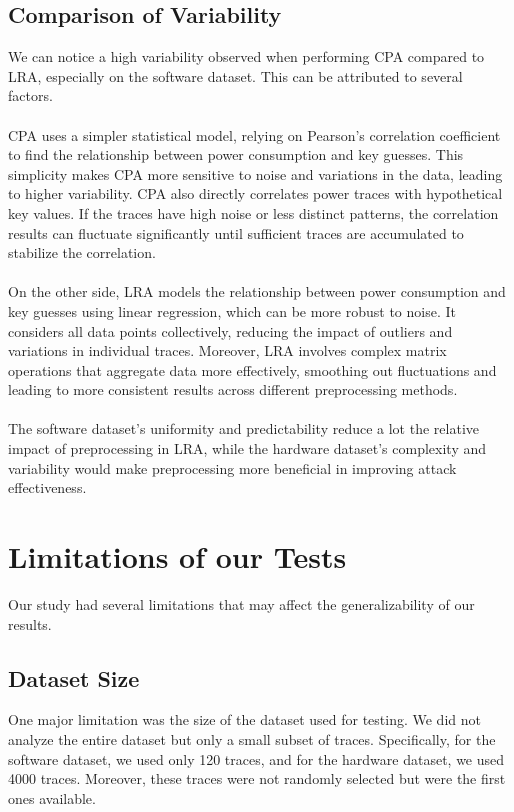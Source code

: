 \documentclass[a4paper,10pt]{article}
\begin{document}
\subsection{Comparison of Variability}
We can notice a high variability observed when performing CPA compared to LRA, especially on the software dataset. This can be attributed to several factors. \\ \\
CPA uses a simpler statistical model, relying on Pearson's correlation coefficient to find the relationship between power consumption and key guesses. This simplicity makes CPA more sensitive to noise and variations in the data, leading to higher variability. CPA also directly correlates power traces with hypothetical key values. If the traces have high noise or less distinct patterns, the correlation results can fluctuate significantly until sufficient traces are accumulated to stabilize the correlation.
\\ \\
On the other side, LRA models the relationship between power consumption and key guesses using linear regression, which can be more robust to noise. It considers all data points collectively, reducing the impact of outliers and variations in individual traces. Moreover, LRA involves complex matrix operations that aggregate data more effectively, smoothing out fluctuations and leading to more consistent results across different preprocessing methods.
\\ \\
The software dataset's uniformity and predictability reduce a lot the relative impact of preprocessing in LRA, while the hardware dataset's complexity and variability would make preprocessing more beneficial in improving attack effectiveness.
\section{Limitations of our Tests}
Our study had several limitations that may affect the generalizability of our results. 

\subsection{Dataset Size}
One major limitation was the size of the dataset used for testing. 
We did not analyze the entire dataset but only a small subset of traces. 
Specifically, for the software dataset, we used only 120 traces, and for the hardware dataset, we used 4000 traces. 
Moreover, these traces were not randomly selected but were the first ones available.
\end{document}

